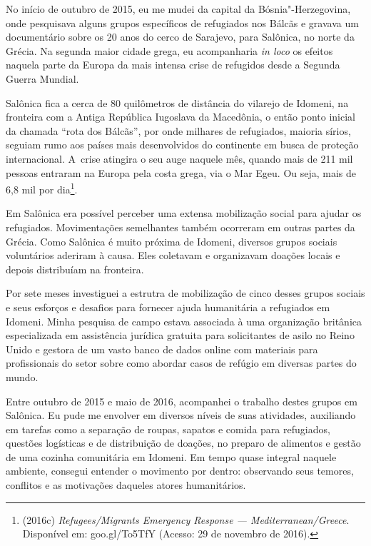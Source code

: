 
No início de outubro de 2015, eu me mudei da capital da Bósnia"-Herzegovina, 
onde pesquisava alguns grupos específicos de refugiados nos Bálcãs e
gravava um documentário sobre os 20 anos do cerco de Sarajevo, para
Salônica, no norte da Grécia. Na segunda maior cidade grega, eu
acompanharia \textit{in loco} os efeitos naquela parte da Europa da mais
 intensa crise de refugidos desde a Segunda Guerra Mundial.

Salônica fica a cerca de 80 quilômetros de distância do vilarejo de
Idomeni, na fronteira com a Antiga República Iugoslava da Macedônia,
o então ponto inicial da chamada ``rota dos Bálcãs'', por onde milhares
de refugiados, maioria sírios, seguiam rumo aos países
mais desenvolvidos do continente em busca de proteção internacional. A~crise atingira o seu auge naquele mês, quando mais de 211 mil pessoas
entraram na Europa pela costa grega, via o Mar Egeu. Ou seja, mais de
6,8 mil por dia\footnote{ (2016c) \emph{Refugees/Migrants Emergency Response ---
Mediterranean/Greece}. Disponível em:
goo.gl/To5TfY (Acesso: 29 de
novembro de 2016).}.

Em Salônica era possível perceber uma extensa mobilização social para ajudar os refugiados. Movimentações semelhantes
também ocorreram em outras partes da Grécia. Como Salônica é muito próxima de Idomeni, diversos grupos sociais voluntários aderiram à causa. Eles coletavam e organizavam doações locais e depois distribuíam na fronteira. 


Por sete meses investiguei a estrutra de mobilização de cinco desses grupos
sociais e seus esforços e desafios para fornecer
ajuda humanitária a refugiados em Idomeni. Minha pesquisa de campo
estava associada à uma organização britânica especializada em
assistência jurídica gratuita para solicitantes de asilo no Reino Unido
e gestora de um vasto banco de dados online com materiais para
profissionais do setor sobre como abordar casos de refúgio em diversas
partes do mundo.

Entre outubro de 2015 e maio de 2016, acompanhei o trabalho destes
grupos em Salônica. Eu pude me envolver em diversos níveis de suas atividades,
auxiliando em tarefas como a separação de roupas, sapatos e comida para
refugiados, questões logísticas e de distribuição de doações, no
preparo de alimentos e gestão de uma cozinha comunitária em Idomeni. Em
tempo quase integral naquele ambiente, consegui entender o movimento por
dentro: observando seus temores, conflitos e as motivações daqueles
atores humanitários.


